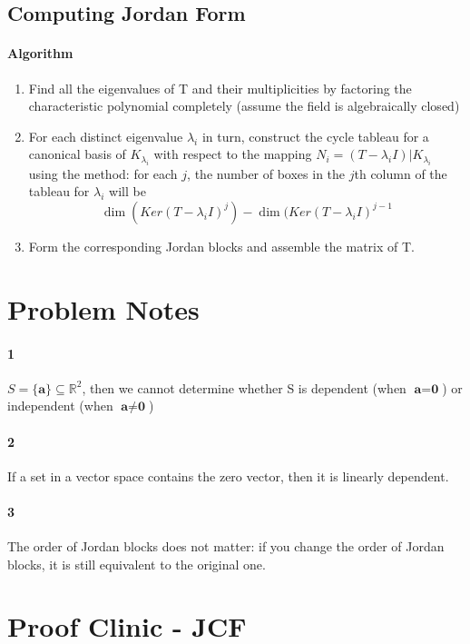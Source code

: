 \documentclass[11pt]{article}
\newcommand{\tb}[1]{\textbf{#1}}
\newcommand{\real}[0]{\mathbb{R}}
\newcommand{\vo}[0]{\tb{0}}
\begin{document}
{\subsection{Computing Jordan Form}
\paragraph{Algorithm}
\begin{enumerate}
	\item Find all the eigenvalues of T and their multiplicities by factoring the characteristic polynomial completely (assume the field is algebraically closed)
	\item For each distinct eigenvalue $\lambda_i$ in turn, construct the cycle tableau for a canonical basis of $K_{\lambda_i}$ with respect to the mapping $N_i = (T - \lambda_iI)|K_{\lambda_i}$ using the method: for each $j$, the number of boxes in the $j$th column of the tableau for $\lambda_i$ will be $$\dim(Ker(T-\lambda_i I)^j) - \dim(Ker(T-\lambda_i I)^{j-1}$$
	\item Form the corresponding Jordan blocks and assemble the matrix of T.
\end{enumerate}


\newpage
\section{Problem Notes}
\paragraph{1} $S = \{\tb{a}\} \subseteq \real^2$, then we cannot determine whether S is dependent (when $\tb{a} = \vo$) or independent (when $\tb{a} \neq \vo$)
\paragraph{2} If a set in a vector space contains the zero vector, then it is linearly dependent.
\paragraph{3} The order of Jordan blocks does not matter: if you change the order of Jordan blocks, it is still equivalent to the original one.



\section{Proof Clinic - JCF}
}
\end{document}
